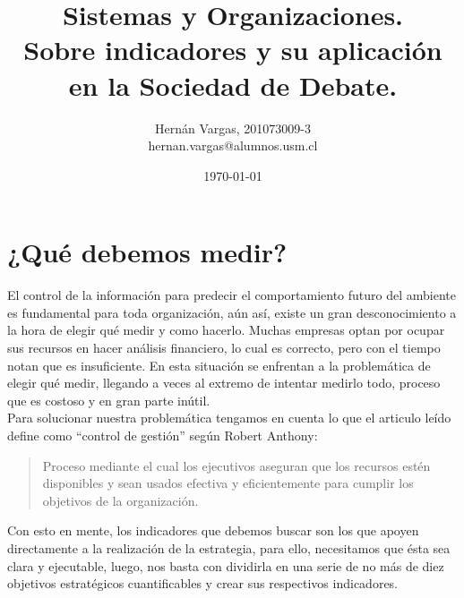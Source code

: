 \documentclass[spanish, fleqn]{article}
\title{ Sistemas y Organizaciones. \\ 
		Sobre indicadores y su aplicación en la Sociedad de Debate.}
\author{Hernán Vargas, 201073009-3 \\ hernan.vargas@alumnos.usm.cl}
\date{\today}
\begin{document}
	\maketitle
	\thispagestyle{empty}

	\thispagestyle{fancy}
	\section{¿Qué debemos medir?}
	El control de la información para predecir el comportamiento futuro del ambiente
	es fundamental para toda organización, aún así, existe un gran desconocimiento a
	la hora de elegir qué medir y como hacerlo. Muchas empresas optan por ocupar
	sus recursos en hacer análisis financiero, lo cual es correcto, pero con el
	tiempo notan que es insuficiente. En esta situación se enfrentan a la
	problemática de elegir qué medir, llegando a veces al extremo de intentar
	medirlo todo, proceso que es costoso y en gran parte inútil.\\
	Para solucionar nuestra problemática tengamos en cuenta lo que el articulo
	leído define como ``control de gestión'' según Robert Anthony: 
	\begin{quote}
		Proceso mediante el cual los ejecutivos aseguran que los recursos estén
		disponibles y sean usados efectiva y eficientemente para cumplir los
		objetivos de la organización.\cite{merc}
	\end{quote}
	Con esto en mente, los indicadores que debemos buscar son los que apoyen 
	directamente a la realización de la estrategia, para ello, necesitamos que 
	ésta sea clara y ejecutable, luego, nos basta con dividirla en una serie 
	de no más de diez objetivos estratégicos cuantificables y crear sus respectivos
	indicadores.
\end{document}
